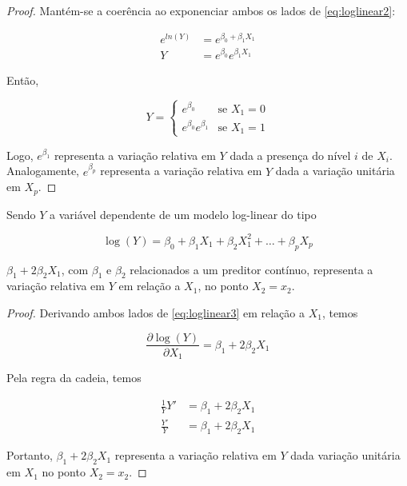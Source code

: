 \begin{proof}
  Mantém-se a coerência ao exponenciar ambos os lados de \eqref{eq:loglinear2}:

  $$
  \begin{aligned}
    e^{ln(Y)} &= e^{\beta_0 + \beta_1X_1} \\
    Y &= e^{\beta_0}e^{\beta_1X_1}
  \end{aligned}
  $$

  Então,

  $$
  Y = 
  \begin{cases}
    e^{\beta_0} & \text{se $X_1=0$} \\
    e^{\beta_0}e^{\beta_1} & \text{se $X_1=1$}
  \end{cases}
  $$

  Logo, $e^{\beta_1}$ representa a variação relativa em $Y$ dada a presença do nível $i$ de $X_i$. Analogamente, $e^{\beta_p}$ representa a variação relativa em $Y$ dada a variação unitária em $X_p$.
\end{proof}

\begin{proposition}
  \label{proposicao3}

  Sendo $Y$ a variável dependente de um modelo log-linear do tipo
  
  \begin{equation}
    \log(Y) = \beta_0 + \beta_1X_1 + \beta_2X^2_1 + \ldots + \beta_pX_p
  \end{equation} \label{eq:loglinear3}
  
  \noindent $\beta_1 + 2\beta_2X_1$, com $\beta_1$ e $\beta_2$ relacionados a um preditor contínuo, representa a variação relativa em $Y$ em relação a $X_1$, no ponto $X_2 = x_2$.
\end{proposition}

\begin{proof}
  Derivando ambos lados de \eqref{eq:loglinear3} em relação a $X_1$, temos

  \begin{equation} \label{eq:derivada1}
    \frac{\partial \log(Y)}{\partial X_1} = \beta_1 + 2\beta_2X_1
  \end{equation}

  Pela regra da cadeia, temos

  $$
  \begin{aligned}
    \frac{1}{Y}Y' &= \beta_1 + 2\beta_2X_1\\
    \frac{Y'}{Y} &= \beta_1 + 2\beta_2X_1
  \end{aligned}
  $$

  Portanto, $\beta_1 + 2 \beta_2X_1$ representa a variação relativa em $Y$ dada variação unitária em $X_1$ no ponto $X_2 = x_2$.
\end{proof}
